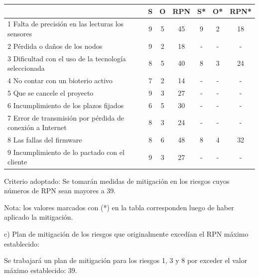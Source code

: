 \documentclass[
11pt, %
]{charter}
\begin{document}
\begin{table}[htpb]
\centering
\begin{tabular}{|l|c|c|c|c|c|c|}
\hline
\rowcolor[HTML]{C0C0C0} 
\multicolumn{1}{|c|}{\cellcolor[HTML]{C0C0C0}Riesgo} & S  & O  & RPN                        & S* & O* & RPN*                       \\ \hline
1 Falta de precisión en las lecturas los sensores & 9  & 5  & 
\cellcolor[HTML]{CB0000}45 & 9  & 2  & 
\cellcolor[HTML]{009901}18  \\ \hline
2 Pérdida o daños de los nodos & 9 & 2 & 
\cellcolor[HTML]{009901}18 & - & - & - \\ \hline
3 Dificultad con el uso de la tecnología seleccionada  &8    &5    & 
\cellcolor[HTML]{CB0000}40 & 8 & 3 & 
\cellcolor[HTML]{009901}24 \\ \hline
4 No contar con un bioterio activo &7    &2    &
\cellcolor[HTML]{009901}14 & - & - & - \\ \hline
5 Que se cancele el proyecto &9 &3 &
\cellcolor[HTML]{009901}27 &- &- &- \\ \hline
6 Incumplimiento de los plazos fijados &6 &5 &
\cellcolor[HTML]{009901}30 &- &- &- \\ \hline
7 Error de transmisión por pérdida de conexión a Internet &8 &3 &
\cellcolor[HTML]{009901}24 &- &- &-\\ \hline
8 Las fallas del firmware &8 &6 & 
\cellcolor[HTML]{CB0000}48 &8 &4 &
\cellcolor[HTML]{009901}32 \\ \hline
9 Incumplimiento de lo pactado con el cliente &9 &3 &
\cellcolor[HTML]{009901}27 &- &- &- \\ \hline
\end{tabular}
\end{table}

Criterio adoptado: 
Se tomarán medidas de mitigación en los riesgos cuyos números de RPN sean mayores a 39.

Nota: los valores marcados con (*) en la tabla corresponden luego de haber aplicado la mitigación.

c) Plan de mitigación de los riesgos que originalmente excedían el RPN máximo establecido:

Se trabajará un plan de mitigación para los riesgos 1, 3 y 8 por exceder el valor máximo establecido: 39.
 
\end{document}
